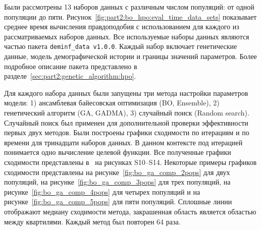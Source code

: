 Были рассмотрены 13 наборов данных с различным числом популяций: от одной популяции до пяти.
Рисунок~\ref{fig:part2:bo_hpo:eval_time_data_sets} показывает среднее время вычисления правдоподобия с использованием \moments для каждого из рассматриваемых наборов данных.
Все используемые наборы данных являются частью пакета \texttt{deminf\_data v1.0.0}.
Каждый набор включает генетические данные, модель демографической истории и границы значений параметров.
Более подробное описание пакета представлено в разделе~\ref{sec:part2:genetic_algorithm:hpo}.

Для каждого набора данных были запущены три метода настройки параметров модели: 1) ансамблевая байесовская оптимизация (BO, Ensemble), 2)  генетический алгоритм (GA, GADMA), 3) случайный поиск (Random search).
Случайный поиск был применен для дополнительной проверки эффективности первых двух методов.
Были построены графики сходимости по итерациям и по времени для тринадцати наборов данных.
В данном контексте под итерацией понимается одно вычисление целевой функции.
Все полученные графики сходимости представлены в~\cite{noskova2023bayesian} на рисунках S10--S14.
Некоторые примеры графиков сходимости представлены на рисунке~\ref{fig:bo_ga_comp_2pops} для двух популяций, на рисунке~\ref{fig:bo_ga_comp_3pops} для трех популяций, на рисунке~\ref{fig:bo_ga_comp_4pops} для четырех популяций и на рисунке~\ref{fig:bo_ga_comp_5pops} для пяти популяций.
Сплошные линии отображают медиану сходимости метода, закрашенная область является областью между квартилями.
Каждый метод был повторен 64 раза.

